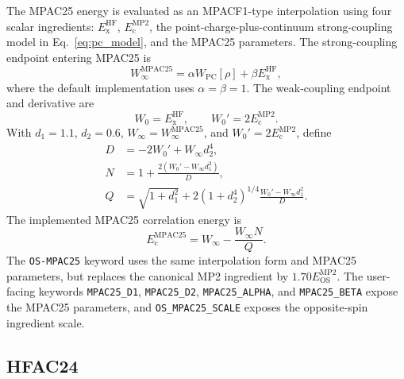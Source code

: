 \documentclass[aip,jcp,reprint,superscriptaddress]{revtex4-2}
\newcommand{\keyword}[1]{\texttt{#1}}
\newcommand{\EMPtwo}{E_{\mathrm{c}}^{\mathrm{MP2}}}
\newcommand{\ExHF}{E_{\mathrm{x}}^{\mathrm{HF}}}
\begin{document}
The MPAC25 energy is evaluated as an MPACF1-type interpolation using four scalar ingredients: \(\ExHF\), \(\EMPtwo\), the point-charge-plus-continuum strong-coupling model in Eq.~\eqref{eq:pc_model}, and the MPAC25 parameters.\cite{MPACF1,MPAC25}  The strong-coupling endpoint entering MPAC25 is
\begin{equation}
  W_\infty^{\mathrm{MPAC25}}
  =
  \alpha W_{\mathrm{PC}}[\rho]+\beta\ExHF,
  \label{eq:mpac25_winf}
\end{equation}
where the default implementation uses \(\alpha=\beta=1\).  The weak-coupling endpoint and derivative are
\begin{equation}
  W_0=\ExHF,\qquad W_0'=2\EMPtwo.
\end{equation}
With \(d_1=1.1\), \(d_2=0.6\), \(W_\infty=W_\infty^{\mathrm{MPAC25}}\), and \(W_0'=2\EMPtwo\), define
\begin{align}
  D &= -2W_0' + W_\infty d_2^4,\\
  N &= 1+\frac{2(W_0'-W_\infty d_1^2)}{D},\\
  Q &= \sqrt{1+d_1^2}
  +2(1+d_2^4)^{1/4}
  \frac{W_0'-W_\infty d_1^2}{D}.
\end{align}
The implemented MPAC25 correlation energy is
\begin{equation}
  E_{\mathrm{c}}^{\mathrm{MPAC25}}
  =
  W_\infty-\frac{W_\infty N}{Q}.
  \label{eq:mpac25_energy}
\end{equation}
The \keyword{OS-MPAC25} keyword uses the same interpolation form and MPAC25 parameters, but replaces the canonical MP2 ingredient by \(1.70E_{\mathrm{OS}}^{\mathrm{MP2}}\).  The user-facing keywords \keyword{MPAC25\_D1}, \keyword{MPAC25\_D2}, \keyword{MPAC25\_ALPHA}, and \keyword{MPAC25\_BETA} expose the MPAC25 parameters, and \keyword{OS\_MPAC25\_SCALE} exposes the opposite-spin ingredient scale.

\subsection{HFAC24}
\end{document}
